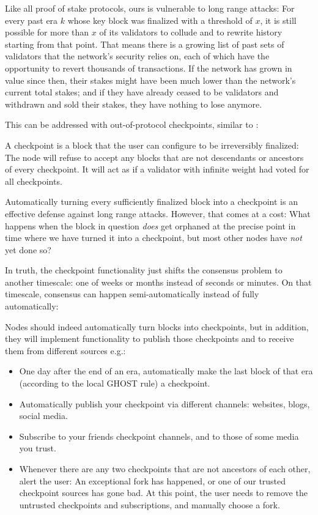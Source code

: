 \documentclass[12pt]{article}
\begin{document}
Like all proof of stake protocols, ours is vulnerable to long range attacks: For every past era $k$ whose key block was finalized with a threshold of $x$, it is still possible for more than $x$ of its validators to collude and to rewrite history starting from that point. That means there is a growing list of past sets of validators that the network's security relies on, each of which have the opportunity to revert thousands of transactions. If the network has grown in value since then, their stakes might have been much lower than the network's current total stakes; and if they have already ceased to be validators and withdrawn and sold their stakes, they have nothing to lose anymore.

This can be addressed with out-of-protocol checkpoints, similar to \cite{buterin2014subjectivity}:

A checkpoint is a block that the user can configure to be irreversibly finalized: The node will refuse to accept any blocks that are not descendants or ancestors of every checkpoint. It will act as if a validator with infinite weight had voted for all checkpoints.

Automatically turning every sufficiently finalized block into a checkpoint is an effective defense against long range attacks. However, that comes at a cost: What happens when the block in question \emph{does} get orphaned at the precise point in time where we have turned it into a checkpoint, but most other nodes have \emph{not} yet done so?

In truth, the checkpoint functionality just shifts the consensus problem to another timescale: one of weeks or months instead of seconds or minutes. On that timescale, consensus can happen semi-automatically instead of fully automatically:

Nodes should indeed automatically turn blocks into checkpoints, but in addition, they will implement functionality to publish those checkpoints and to receive them from different sources e.g.:
\begin{itemize}
  \item One day after the end of an era, automatically make the last block of that era (according to the local GHOST rule) a checkpoint.
  \item Automatically publish your checkpoint via different channels: websites, blogs, social media.
  \item Subscribe to your friends checkpoint channels, and to those of some media you trust.
  \item Whenever there are any two checkpoints that are not ancestors of each other, alert the user: An exceptional fork has happened, or one of our trusted checkpoint sources has gone bad. At this point, the user needs to remove the untrusted checkpoints and subscriptions, and manually choose a fork.
\end{itemize}

\newpage

\printbibliography
\end{document}

